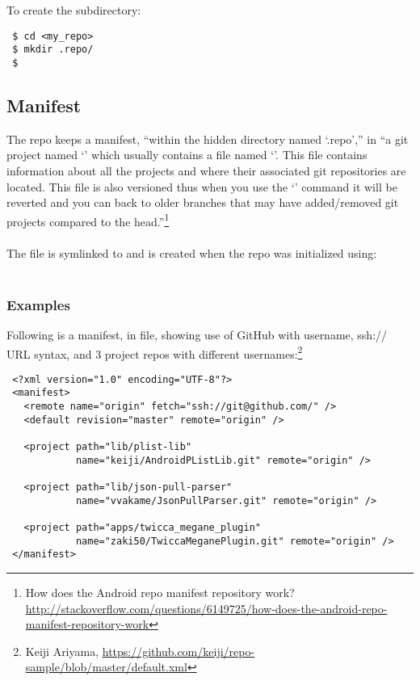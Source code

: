 \noindent To create the  subdirectory:

\begin{Verbatim}
 $ cd <my_repo>
 $ mkdir .repo/
 $ 
\end{Verbatim}

\subsection{Manifest}
The repo keeps a manifest, ``within the hidden directory named `.repo','' 
in ``a git project named `' which
usually contains a file named `'.  This file
contains information about all the projects and where their associated
git repositories are located.  This file is also versioned thus when
you use the `' command it will be reverted and you
can back to older branches that may have added/removed git projects
compared to the head.''\footnote{How does the Android repo manifest repository work?\\
\href{http://stackoverflow.com/questions/6149725/how-does-the-android-repo-manifest-repository-work}
{http://stackoverflow.com/questions/6149725/how-does-the-android-repo-manifest-repository-work}}
\\
\\
The  file is symlinked to  and
is created when the repo was initialized using:
\\
\\


\subsubsection{Examples}
Following is a manifest, in  file, showing use
of GitHub with username, ssh:// URL syntax, and 3 project repos
with different usernames:\footnote{Keiji Ariyama, \href{https://github.com/keiji/repo-sample/blob/master/default.xml}{https://github.com/keiji/repo-sample/blob/master/default.xml}}

\begin{Verbatim}
 <?xml version="1.0" encoding="UTF-8"?>
 <manifest>
   <remote name="origin" fetch="ssh://git@github.com/" />
   <default revision="master" remote="origin" />

   <project path="lib/plist-lib"
            name="keiji/AndroidPListLib.git" remote="origin" />

   <project path="lib/json-pull-parser"
            name="vvakame/JsonPullParser.git" remote="origin" />

   <project path="apps/twicca_megane_plugin"
            name="zaki50/TwiccaMeganePlugin.git" remote="origin" />
 </manifest>
\end{Verbatim}


